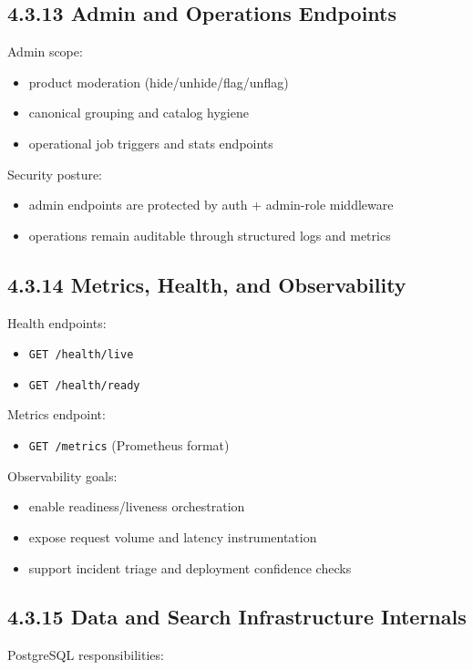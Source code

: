 \documentclass[12pt,a4paper]{report}
\begin{document}
\subsection{4.3.13 Admin and Operations Endpoints}
Admin scope:

\begin{itemize}
\item product moderation (hide/unhide/flag/unflag)
\item canonical grouping and catalog hygiene
\item operational job triggers and stats endpoints
\end{itemize}

Security posture:

\begin{itemize}
\item admin endpoints are protected by auth + admin-role middleware
\item operations remain auditable through structured logs and metrics
\end{itemize}

\subsection{4.3.14 Metrics, Health, and Observability}
Health endpoints:

\begin{itemize}
\item \texttt{GET /health/live}
\item \texttt{GET /health/ready}
\end{itemize}

Metrics endpoint:

\begin{itemize}
\item \texttt{GET /metrics} (Prometheus format)
\end{itemize}

Observability goals:

\begin{itemize}
\item enable readiness/liveness orchestration
\item expose request volume and latency instrumentation
\item support incident triage and deployment confidence checks
\end{itemize}

\subsection{4.3.15 Data and Search Infrastructure Internals}
PostgreSQL responsibilities:
\end{document}
